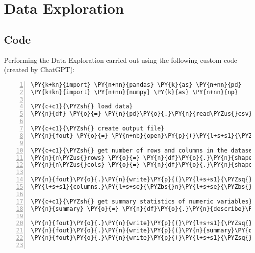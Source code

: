 \documentclass[12pt]{article}
\begin{document}
\section{Data Exploration} \subsection{Code}Performing the Data Exploration carried out using the following custom code (created by ChatGPT):

\begin{Verbatim}[commandchars=\\\{\},numbers=left,firstnumber=1,stepnumber=1,formatcom=\footnotesize]
\PY{k+kn}{import} \PY{n+nn}{pandas} \PY{k}{as} \PY{n+nn}{pd}
\PY{k+kn}{import} \PY{n+nn}{numpy} \PY{k}{as} \PY{n+nn}{np}

\PY{c+c1}{\PYZsh{} load data}
\PY{n}{df} \PY{o}{=} \PY{n}{pd}\PY{o}{.}\PY{n}{read\PYZus{}csv}\PY{p}{(}\PY{l+s+s1}{\PYZsq{}}\PY{l+s+s1}{diabetes\PYZus{}binary\PYZus{}health\PYZus{}indicators\PYZus{}BRFSS2015.csv}\PY{l+s+s1}{\PYZsq{}}\PY{p}{)}

\PY{c+c1}{\PYZsh{} create output file}
\PY{n}{fout} \PY{o}{=} \PY{n+nb}{open}\PY{p}{(}\PY{l+s+s1}{\PYZsq{}}\PY{l+s+s1}{data\PYZus{}exploration.txt}\PY{l+s+s1}{\PYZsq{}}\PY{p}{,} \PY{l+s+s1}{\PYZsq{}}\PY{l+s+s1}{w}\PY{l+s+s1}{\PYZsq{}}\PY{p}{)}

\PY{c+c1}{\PYZsh{} get number of rows and columns in the dataset}
\PY{n}{n\PYZus{}rows} \PY{o}{=} \PY{n}{df}\PY{o}{.}\PY{n}{shape}\PY{p}{[}\PY{l+m+mi}{0}\PY{p}{]}
\PY{n}{n\PYZus{}cols} \PY{o}{=} \PY{n}{df}\PY{o}{.}\PY{n}{shape}\PY{p}{[}\PY{l+m+mi}{1}\PY{p}{]}

\PY{n}{fout}\PY{o}{.}\PY{n}{write}\PY{p}{(}\PY{l+s+s1}{\PYZsq{}}\PY{l+s+s1}{This dataset contains }\PY{l+s+si}{\PYZob{}0\PYZcb{}}\PY{l+s+s1}{ rows and }\PY{l+s+si}{\PYZob{}1\PYZcb{}}\PY{l+s+s1}{ }\PY{l+s+se}{\PYZbs{}}
\PY{l+s+s1}{columns.}\PY{l+s+se}{\PYZbs{}n}\PY{l+s+se}{\PYZbs{}n}\PY{l+s+s1}{\PYZsq{}}\PY{o}{.}\PY{n}{format}\PY{p}{(}\PY{n}{n\PYZus{}rows}\PY{p}{,} \PY{n}{n\PYZus{}cols}\PY{p}{)}\PY{p}{)}

\PY{c+c1}{\PYZsh{} get summary statistics of numeric variables}
\PY{n}{summary} \PY{o}{=} \PY{n}{df}\PY{o}{.}\PY{n}{describe}\PY{p}{(}\PY{n}{include}\PY{o}{=}\PY{n}{np}\PY{o}{.}\PY{n}{number}\PY{p}{)}\PY{o}{.}\PY{n}{T}

\PY{n}{fout}\PY{o}{.}\PY{n}{write}\PY{p}{(}\PY{l+s+s1}{\PYZsq{}}\PY{l+s+s1}{Summary Statistics of Numeric Variables:}\PY{l+s+se}{\PYZbs{}n}\PY{l+s+s1}{\PYZsq{}}\PY{p}{)}
\PY{n}{fout}\PY{o}{.}\PY{n}{write}\PY{p}{(}\PY{n}{summary}\PY{o}{.}\PY{n}{to\PYZus{}string}\PY{p}{(}\PY{p}{)}\PY{p}{)}
\PY{n}{fout}\PY{o}{.}\PY{n}{write}\PY{p}{(}\PY{l+s+s1}{\PYZsq{}}\PY{l+s+se}{\PYZbs{}n}\PY{l+s+se}{\PYZbs{}n}\PY{l+s+s1}{\PYZsq{}}\PY{p}{)}


\end{Verbatim}
\end{document}
